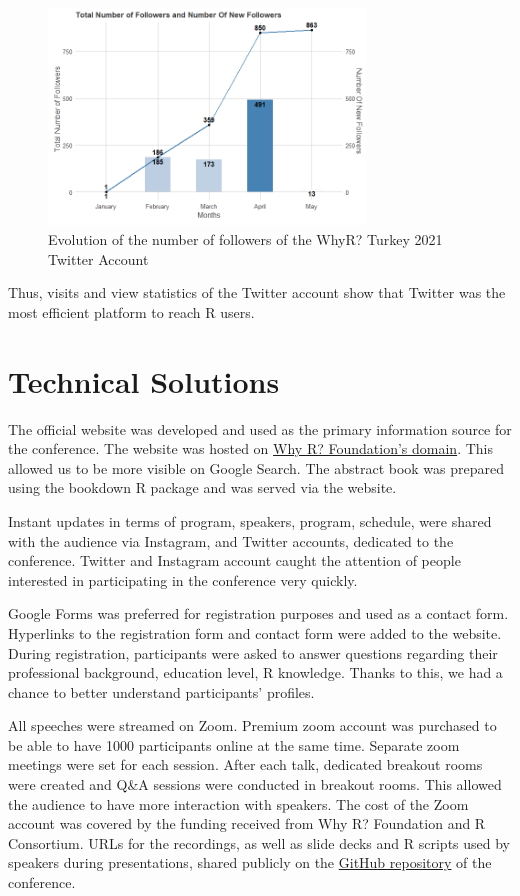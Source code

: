 \begin{figure}[h]
    \centering
    \includegraphics[width=0.75\textwidth]{whyr_twiter.png}
    \caption{Evolution of the number of followers of the WhyR? Turkey 2021 Twitter Account}
    \label{fig4}
\end{figure}

Thus, visits and view statistics of the Twitter account show that Twitter was the most efficient platform to reach R users. 


\section{Technical Solutions}

The official website was developed and used as the primary information source for the conference. The website was hosted on \href{whyr.pl}{Why R? Foundation's domain}. This allowed us to be more visible on Google Search. The abstract book was prepared using the bookdown R package and was served via the website.

Instant updates in terms of program, speakers, program, schedule, were shared with the audience via Instagram, and Twitter accounts, dedicated to the conference. Twitter and Instagram account caught the attention of people interested in participating in the conference very quickly.

Google Forms was preferred for registration purposes and used as a contact form. Hyperlinks to the registration form and contact form were added to the website. During registration, participants were asked to answer questions regarding their professional background, education level, R knowledge. Thanks to this, we had a chance to better understand participants' profiles.

All speeches were streamed on Zoom. Premium zoom account was purchased to be able to have 1000 participants online at the same time. Separate zoom meetings were set for each session. After each talk, dedicated breakout rooms were created and Q\&A sessions were conducted in breakout rooms. This allowed the audience to have more interaction with speakers. The cost of the Zoom account was covered by the funding received from Why R? Foundation and R Consortium. URLs for the recordings, as well as slide decks and R scripts used by speakers during presentations, shared publicly on the \href{https://github.com/whyr2021turkey/Konusmalar}
{GitHub repository} of the conference.

